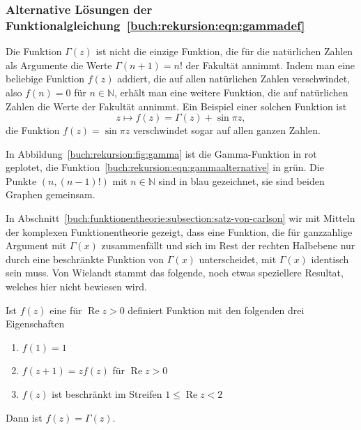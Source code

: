 %
%
\subsubsection{Alternative Lösungen der
Funktionalgleichung~\ref{buch:rekursion:eqn:gammadef}}
Die Funktion $\Gamma(z)$ ist nicht die einzige Funktion, die für
die natürlichen Zahlen als Argumente die Werte $\Gamma(n+1) = n!$
der Fakultät annimmt.
Indem man eine beliebige Funktion $f(z)$ addiert, die auf allen
natürlichen Zahlen verschwindet, also $f(n)=0$ für $n\in\mathbb{N}$,
erhält man eine weitere Funktion, die auf natürlichen Zahlen
die Werte der Fakultät annimmt.
Ein Beispiel einer solchen Funktion ist
\begin{equation}
z\mapsto f(z)=\Gamma(z) + \sin \pi z,
\label{buch:rekursion:eqn:gammaalternative}
\end{equation}
die Funktion $f(z)=\sin\pi z$ verschwindet sogar auf allen ganzen
Zahlen.

In Abbildung~\ref{buch:rekursion:fig:gamma} ist die Gamma-Funktion
in rot geplotet, die Funktion~\eqref{buch:rekursion:eqn:gammaalternative}
in grün.
Die Punkte $(n,(n-1)!)$ mit $n\in\mathbb{N}$ sind in blau gezeichnet,
sie sind beiden Graphen gemeinsam.

In Abschnitt~\ref{buch:funktionentheorie:subsection:satz-von-carlson}
wir mit Mitteln der komplexen Funktionentheorie gezeigt, dass eine
Funktion, die für ganzzahlige Argument mit $\Gamma(x)$ zusammenfällt
und sich im Rest der rechten Halbebene nur durch eine beschränkte
Funktion von $\Gamma(x)$ unterscheidet, mit $\Gamma(x)$
identisch sein muss.
Von Wielandt stammt das folgende, noch etwas speziellere Resultat,
welches hier nicht bewiesen wird.

\begin{satz}[Wielandt]
%
%
Ist $f(z)$ eine für $\operatorname{Re}z>0$ definiert Funktion mit
den folgenden drei Eigenschaften
\begin{enumerate}
\item $f(1)=1$
\item $f(z+1)=zf(z)$ für $\operatorname{Re}z>0$
\item $f(z)$ ist beschränkt im Streifen $1\le \operatorname{Re}z< 2$
\end{enumerate}
Dann ist $ f(z) = \Gamma(z) $.
\end{satz}


%
%
